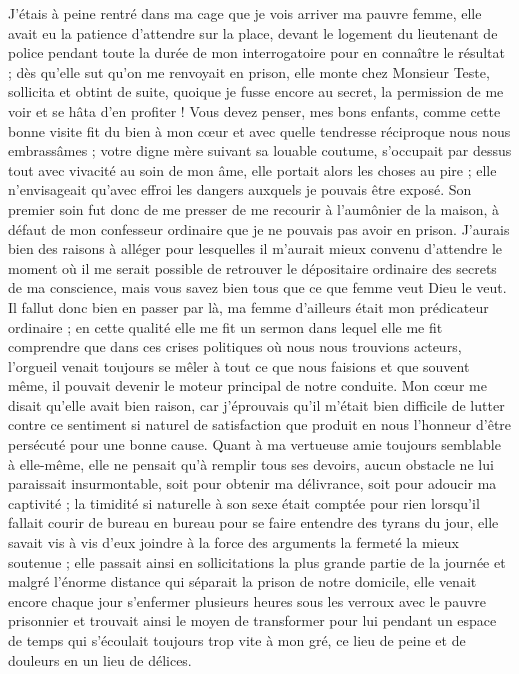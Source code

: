 \documentclass[11pt,a4paper]{report}
\begin{document}
J'étais à peine rentré dans ma cage que je vois arriver ma pauvre femme, elle avait eu la patience d'attendre sur la place, devant le logement du lieutenant de police pendant toute la durée de mon interrogatoire pour en connaître le résultat ; dès qu'elle sut qu'on me renvoyait en prison, elle monte chez Monsieur Teste, sollicita et obtint de suite, quoique je fusse encore au secret, la permission de me voir et se hâta d'en profiter ! Vous devez penser, mes bons enfants, comme cette bonne visite fit du bien à mon cœur et avec quelle tendresse réciproque nous nous embrassâmes ; votre digne mère suivant sa louable coutume, s'occupait par dessus tout avec vivacité au soin de mon âme, elle portait alors les choses au pire ; elle n'envisageait qu'avec effroi les dangers auxquels je pouvais être exposé. Son premier soin fut donc de me presser de me recourir à l'aumônier de la maison, à défaut de mon confesseur ordinaire que je ne pouvais pas avoir en prison. J'aurais bien des raisons à alléger pour lesquelles il m'aurait mieux convenu d'attendre le moment où il me serait possible de retrouver le dépositaire ordinaire des secrets de ma conscience, mais vous savez bien tous que ce que femme veut Dieu le veut. Il fallut donc bien en passer par là, ma femme d'ailleurs était mon prédicateur ordinaire ; en cette qualité elle me fit un sermon dans lequel elle me fit comprendre que dans ces crises politiques où nous nous trouvions acteurs, l'orgueil venait toujours se mêler à tout ce que nous faisions et que souvent même, il pouvait devenir le moteur principal de notre conduite. Mon cœur me disait qu'elle avait bien raison, car j'éprouvais qu'il m'était bien difficile de lutter contre ce sentiment si naturel de satisfaction que produit en nous l'honneur d'être persécuté pour une bonne cause. Quant à ma vertueuse amie toujours semblable à elle-même, elle ne pensait qu'à remplir tous ses devoirs, aucun obstacle ne lui paraissait insurmontable, soit pour obtenir ma délivrance, soit pour adoucir ma captivité ; la timidité si naturelle à son sexe était comptée pour rien lorsqu'il fallait courir de bureau en bureau pour se faire entendre des tyrans du jour, elle savait vis à vis d'eux joindre à la force des arguments la fermeté la mieux soutenue ; elle passait ainsi en sollicitations la plus grande partie de la journée et malgré l'énorme distance qui séparait la prison de notre domicile, elle venait encore chaque jour s'enfermer plusieurs heures sous les verroux avec le pauvre prisonnier et trouvait ainsi le moyen de transformer pour lui pendant un espace de temps qui s'écoulait toujours trop vite à mon gré, ce lieu de peine et de douleurs en un lieu de délices.
\end{document}
